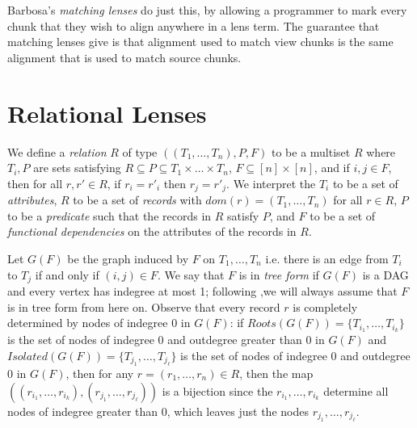 \documentclass[acmsmall,review,anonymous]{acmart}\settopmatter{printfolios=true,printccs=false,printacmref=false}
\theoremstyle{definition}
\begin{document}
Barbosa's {\em matching lenses} \cite{barbosa2010matching} do just this, by allowing a programmer to mark every chunk that they wish to align anywhere in a lens term. The guarantee that matching lenses give is that alignment used to match view chunks is the same alignment that is used to match source chunks.

\iffalse
\section{Relational Lenses}
We define a {\em relation} $R$ of type $((T_1, \ldots, T_n), P, F)$ to be a
multiset $R$ where $T_i, P$ are sets satisfying $R \subseteq P \subseteq T_1
\times \ldots \times T_n$, $F \subseteq [n] \times [n]$, and if $i, j \in F$,
then for all $r, r' \in R$, if $r_i = r'_i$ then $r_j = r'_j$. We interpret the
$T_i$ to be a set of {\em attributes}, $R$ to be a set of {\em records} with
$dom(r) = (T_1, \ldots, T_n)$ for all $r \in R$, $P$ to be a {\em predicate}
such that the records in $R$ satisfy $P$, and $F$ to be a set of {\em
functional dependencies} on the attributes of the records in $R$.

Let $G(F)$ be the graph induced by $F$ on $T_1, \ldots, T_n$ i.e. there is an
edge from $T_i$ to $T_j$ if and only if $(i, j) \in F$. We say that $F$ is
in {\em tree form} if $G(F)$ is a DAG and every vertex has indegree at most 1;
following \cite{bohannon2006relational},we will always assume that $F$ is in
tree form from here on. Observe that every record $r$ is completely determined
by nodes of indegree 0 in $G(F)$: if $Roots(G(F)) = \{T_{i_1}, \ldots,
T_{i_k}\}$ is the set of nodes of indegree 0 and outdegree greater than 0 in
$G(F)$ and $Isolated(G(F)) = \{T_{j_1}, \ldots, T_{j_\ell}\}$ is the set of
nodes of indegree 0 and outdegree 0 in $G(F)$, then for any $r = (r_1, \ldots,
r_n)\in R$, then the map $((r_{i_1}, \ldots, r_{i_k}), (r_{j_1}, \ldots,
r_{j_\ell}))$ is a bijection since the $r_{i_1}, \ldots, r_{i_k}$ determine all
nodes of indegree greater than 0, which leaves just the nodes $r_{j_1}, \ldots,
r_{j_\ell}$.
\end{document}
